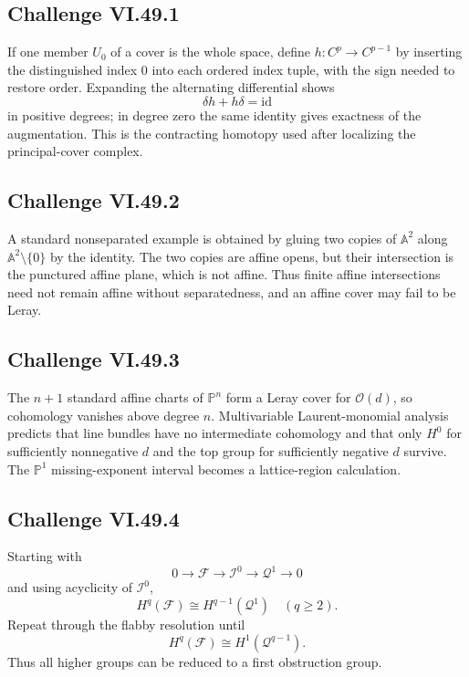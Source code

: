 \subsection*{Challenge VI.49.1}
\begin{solution}
If one member \(U_0\) of a cover is the whole space, define \(h:C^p\to C^{p-1}\) by inserting the distinguished index \(0\) into each ordered index tuple, with the sign needed to restore order.  Expanding the alternating differential shows
\[
\delta h+h\delta=\mathrm{id}
\]
in positive degrees; in degree zero the same identity gives exactness of the augmentation.  This is the contracting homotopy used after localizing the principal-cover complex.
\end{solution}

\subsection*{Challenge VI.49.2}
\begin{solution}
A standard nonseparated example is obtained by gluing two copies of \(\mathbb A^2\) along \(\mathbb A^2\setminus\{0\}\) by the identity.  The two copies are affine opens, but their intersection is the punctured affine plane, which is not affine.  Thus finite affine intersections need not remain affine without separatedness, and an affine cover may fail to be Leray.
\end{solution}

\subsection*{Challenge VI.49.3}
\begin{solution}
The \(n+1\) standard affine charts of \(\mathbb P^n\) form a Leray cover for \(\mathcal O(d)\), so cohomology vanishes above degree \(n\).  Multivariable Laurent-monomial analysis predicts that line bundles have no intermediate cohomology and that only \(H^0\) for sufficiently nonnegative \(d\) and the top group for sufficiently negative \(d\) survive.  The \(\mathbb P^1\) missing-exponent interval becomes a lattice-region calculation.
\end{solution}

\subsection*{Challenge VI.49.4}
\begin{solution}
Starting with
\[
0\to\mathcal F\to\mathcal I^0\to\mathcal Q^1\to0
\]
and using acyclicity of \(\mathcal I^0\),
\[
H^q(\mathcal F)\cong H^{q-1}(\mathcal Q^1)\quad(q\ge2).
\]
Repeat through the flabby resolution until
\[
H^q(\mathcal F)\cong H^1(\mathcal Q^{q-1}).
\]
Thus all higher groups can be reduced to a first obstruction group.
\end{solution}

